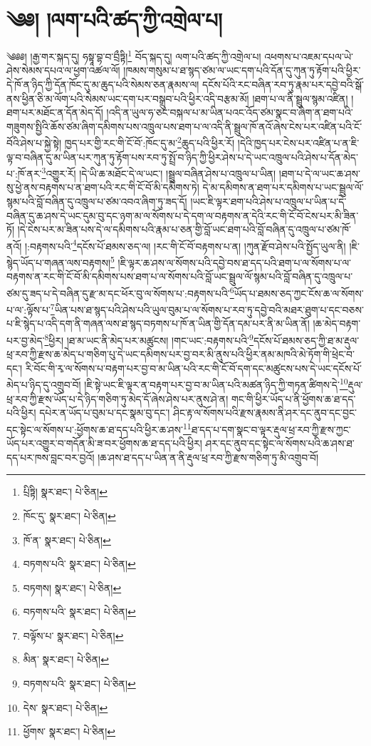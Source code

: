 \setcounter{footnote}{0} 
\chapter{༄༅། །ལག་པའི་ཚད་ཀྱི་འགྲེལ་པ།}༄༅༅། །རྒྱ་གར་སྐད་དུ། ཧསྟཱ་བྷ་བ་བྲྀཏྟི།\footnote{པྲིཏྟི།  སྣར་ཐང་།  པེ་ཅིན། } བོད་སྐད་དུ། ལག་པའི་ཚད་ཀྱི་འགྲེལ་པ། འཕགས་པ་འཇམ་དཔལ་ཡེ་ཤེས་སེམས་དཔའ་ལ་ཕྱག་འཚལ་ལོ། །ཁམས་གསུམ་པ་ཐ་སྙད་ཙམ་ལ་ཡང་དག་པའི་དོན་དུ་ཀུན་ཏུ་རྟོག་པའི་ཕྱིར་དེ་ཁོ་ན་ཉིད་ཀྱི་དོན་ཁོང་དུ་མ་ཆུད་པའི་སེམས་ཅན་རྣམས་ལ། དངོས་པོའི་རང་བཞིན་རབ་ཏུ་རྣམ་པར་དབྱེ་བའི་སྒོ་ནས་ཕྱིན་ཅི་མ་ལོག་པའི་སེམས་ཡང་དག་པར་བསྒྲུབ་པའི་ཕྱིར་འདི་བརྩམ་མོ། །ཐག་པ་ལ་ནི་སྦྲུལ་སྙམ་འཛིན། །ཐག་པར་མཐོང་ན་དོན་མེད་དོ། །འདི་ན་ཡུལ་ཧ་ཅང་བསྐལ་པ་མ་ཡིན་པའང་འོད་ཙམ་སྣང་བ་ཞིག་ན་ཐག་པའི་གཟུགས་སྤྱིའི་ཆོས་ཙམ་ཞིག་དམིགས་པས་འཁྲུལ་པས་ཐག་པ་ལ་འདི་ནི་སྦྲུལ་ཁོ་ནའོ་ཞེས་ངེས་པར་འཛིན་པའི་ངོ་བོའི་ཤེས་པ་སྐྱེ་སྟེ། ཁྱད་པར་གྱི་རང་གི་ངོ་བོ་:ཁོང་དུ་མ་\footnote{ཁོང་དུ་  སྣར་ཐང་།  པེ་ཅིན། }ཆུད་པའི་ཕྱིར་རོ། །དེའི་ཁྱད་པར་ངེས་པར་འཛིན་པ་ན་ཇི་ལྟ་བ་བཞིན་དུ་མ་ཡིན་པར་ཀུན་ཏུ་རྟོག་པས་རབ་ཏུ་སྤྲོ་བ་ཉིད་ཀྱི་ཕྱིར་ཤེས་པ་དེ་ཡང་འཁྲུལ་པའི་ཤེས་པ་དོན་མེད་པ་:ཁོ་ནར་\footnote{ཁོ་ན་  སྣར་ཐང་།  པེ་ཅིན། }འགྱུར་རོ། །དེ་ཡི་ཆ་མཐོང་དེ་ལ་ཡང་། །སྦྲུལ་བཞིན་ཤེས་པ་འཁྲུལ་པ་ཡིན། །ཐག་པ་དེ་ལ་ཡང་ཆ་ཤས་སུ་ཕྱེ་ནས་བརྟགས་པ་ན་ཐག་པའི་རང་གི་ངོ་བོ་མི་དམིགས་ཏེ། དེ་མ་དམིགས་ན་ཐག་པར་དམིགས་པ་ཡང་སྦྲུལ་ལོ་སྙམ་པའི་བློ་བཞིན་དུ་འཁྲུལ་པ་ཙམ་འབའ་ཞིག་ཏུ་ཟད་དོ། །ཡང་ཇི་ལྟར་ཐག་པའི་ཤེས་པ་འཁྲུལ་པ་ཡིན་པ་དེ་བཞིན་དུ་ཆ་ཤས་དེ་ཡང་དུམ་བུ་དང་ཉག་མ་ལ་སོགས་པ་དེ་དག་ལ་བརྟགས་ན་དེའི་རང་གི་ངོ་བོ་ངེས་པར་མི་ཟིན་ཏོ། །དེ་ངེས་པར་མ་ཟིན་པས་དེ་ལ་དམིགས་པའི་རྣམ་པ་ཅན་གྱི་བློ་ཡང་ཐག་པའི་བློ་བཞིན་དུ་འཁྲུལ་པ་ཙམ་ཁོ་ནའོ། །:བརྟགས་པའི་\footnote{བཏགས་པའི་  སྣར་ཐང་།  པེ་ཅིན། }དངོས་པོ་ཐམས་ཅད་ལ། །རང་གི་ངོ་བོ་བརྟགས་པ་ན། །ཀུན་རྫོབ་ཤེས་པའི་སྤྱོད་ཡུལ་ནི། །ཇི་སྙེད་ཡོད་པ་གཞན་ལས་བརྟགས།\footnote{བཏགས།  སྣར་ཐང་།  པེ་ཅིན། } །ཇི་ལྟར་ཆ་ཤས་ལ་སོགས་པའི་དབྱེ་བས་ཐ་དད་པའི་ཐག་པ་ལ་སོགས་པ་ལ་བརྟགས་ན་རང་གི་ངོ་བོ་མི་དམིགས་པས་ཐག་པ་ལ་སོགས་པའི་བློ་ཡང་སྦྲུལ་ལོ་སྙམ་པའི་བློ་བཞིན་དུ་འཁྲུལ་པ་ཙམ་དུ་ཟད་པ་དེ་བཞིན་དུ་རྫ་མ་དང་ཕོར་བུ་ལ་སོགས་པ་:བརྟགས་པའི་\footnote{བཏགས་པའི་  སྣར་ཐང་།  པེ་ཅིན། }ཡོད་པ་ཐམས་ཅད་ཀྱང་ངོས་ཆ་ལ་སོགས་པ་ལ་:ལྟོས་པ་\footnote{བལྟོས་པ་  སྣར་ཐང་།  པེ་ཅིན། }ཡིན་པས་ཐ་སྙད་པའི་ཤེས་པའི་ཡུལ་བུམ་པ་ལ་སོགས་པ་རབ་ཏུ་དབྱེ་བའི་མཐར་ཐུག་པ་དང་བཅས་པ་ཇི་སྙེད་པ་འདི་དག་ནི་གཞན་ལས་ཐ་སྙད་བཏགས་པ་ཁོ་ན་ཡིན་གྱི་དོན་དམ་པར་ནི་མ་ཡིན་ནོ། །ཆ་མེད་བརྟག་པར་བྱ་མེད་\footnote{མིན་  སྣར་ཐང་།  པེ་ཅིན། }ཕྱིར། །ཐ་མ་ཡང་ནི་མེད་པར་མཚུངས། །གང་ཡང་:བརྟགས་པའི་\footnote{བཏགས་པའི་  སྣར་ཐང་།  པེ་ཅིན། }དངོས་པོ་ཐམས་ཅད་ཀྱི་ཐ་མ་རྡུལ་ཕྲ་རབ་ཀྱི་རྫས་ཆ་མེད་པ་གཅིག་པུ་དེ་ཡང་དམིགས་པར་བྱ་བར་མི་ནུས་པའི་ཕྱིར་ནམ་མཁའི་མེ་ཏོག་གི་ཕྲེང་བ་དང་། རི་བོང་གི་རྭ་ལ་སོགས་པ་བརྟག་པར་བྱ་བ་མ་ཡིན་པའི་རང་གི་ངོ་བོ་དག་དང་མཚུངས་པས་དེ་ཡང་དངོས་པོ་མེད་པ་ཉིད་དུ་འགྲུབ་བོ། །ཇི་སྟེ་ཡང་ཇི་ལྟར་ན་བརྟག་པར་བྱ་བ་མ་ཡིན་པའི་མཚན་ཉིད་ཀྱི་གཏན་ཚིགས་དེ་\footnote{དེས་  སྣར་ཐང་།  པེ་ཅིན། }རྡུལ་ཕྲ་རབ་ཀྱི་རྫས་ཡོད་པ་དེ་ཉིད་གཅིག་ཏུ་མེད་དོ་ཞེས་ཤེས་པར་ནུས་ཤེ་ན། གང་གི་ཕྱིར་ཡོད་པ་ནི་ཕྱོགས་ཆ་ཐ་དད་པའི་ཕྱིར། དཔེར་ན་ཡོད་པ་བུམ་པ་དང་སྣམ་བུ་དང་། ཤིང་རྟ་ལ་སོགས་པའི་རྫས་རྣམས་ནི་ཤར་དང་ནུབ་དང་བྱང་དང་སྟེང་ལ་སོགས་པ་:ཕྱོགས་ཆ་ཐ་དད་པའི་ཕྱིར་ཆ་ཤས་\footnote{ཕྱོགས་  སྣར་ཐང་།  པེ་ཅིན། }ཐ་དད་པ་དག་སྣང་བ་ལྟར་རྡུལ་ཕྲ་རབ་ཀྱི་རྫས་ཀྱང་ཡོད་པར་འགྱུར་བ་གདོན་མི་ཟ་བར་ཕྱོགས་ཆ་ཐ་དད་པའི་ཕྱིར། ཤར་དང་ནུབ་དང་སྟེང་ལ་སོགས་པའི་ཆ་ཤས་ཐ་དད་པར་ཁས་བླང་བར་བྱའོ། །ཆ་ཤས་ཐ་དད་པ་ཡིན་ན་ནི་རྡུལ་ཕྲ་རབ་ཀྱི་རྫས་གཅིག་ཏུ་མི་འགྲུབ་བོ། 